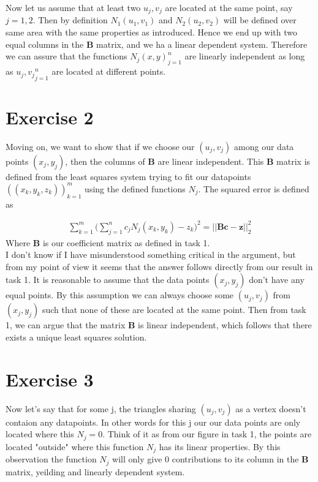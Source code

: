 \documentclass[a4paper,norsk]{article}
\begin{document}
Now let us assume that at least two ${u_j, v_j}$ are located at the same point, say $j = 1,2$. Then by definition $N_1(u_1, v_1)$ and $N_2(u_2, v_2)$ will be defined over same area with the same properties as introduced. Hence we end up with two equal columns in the \textbf{B} matrix, and we ha a linear dependent system. Therefore we can assure that the functions ${N_j(x, y)}_{j=1}^n$ are linearly independent as long as ${u_j, v_j}_{j=1}^n$ are located at different points.

\newpage
\section*{Exercise 2}
Moving on, we want to show that if we choose our $(u_j, v_j)$ among our data points $(x_j, y_j)$, then the columns of \textbf{B} are linear independent. This 
\textbf{B} matrix is defined from the least squares system trying to fit our datapoints $((x_k, y_k, z_k))_{k=1}^m$ using the defined functions $N_j$. The squared
error is defined as 

\begin{align*}
\sum_{k=1}^m \Big(\sum_{j=1}^n c_j N_j(x_k, y_k) - z_k  \Big)^2 = {||\textbf{Bc} - \textbf{z} ||_2^2}
\end{align*}
Where \textbf{B} is our coefficient matrix as defined in task 1. \\
I don't know if I have misunderstood something critical in the argument, but from my point of view it seems that the answer follows directly from our result in task 1. It is reasonable to assume that the data points $(x_j, y_j)$ don't have any equal points. By this assumption we can always choose some $(u_j, v_j)$ 
from $(x_j, y_j)$ such that none of these are located at the same point. Then from task 1, we can argue that the matrix \textbf{B} is linear independent, which follows that there exists a unique least squares solution.

\section*{Exercise 3}
Now let's say that for some j, the triangles sharing $(u_j, v_j)$ as a vertex doesn't contaion any datapoints. In other words for this j our our data points are only located where this $N_j = 0$. Think of it as from our figure in task 1, the points are located "outside" where this function $N_j$ has its linear properties.
By this observation the function $N_j$ will only give 0 contributions to its column in the \textbf{B} matrix, yeilding and linearly dependent system.  
\end{document}
